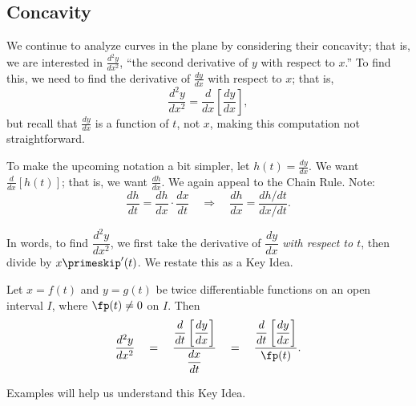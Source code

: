 \subsection{Concavity}

We continue to analyze curves in the plane by considering their concavity; that is, we are interested in $\frac{d^2y}{dx^2}$, ``the second derivative of $y$ with respect to $x$.'' To find this, we need to find the derivative of $\frac{dy}{dx}$ with respect to $x$; that is,
\[\frac{d^2y}{dx^2}=\frac{d}{dx}\left[\frac{dy}{dx}\right],\]
but recall that $\frac{dy}{dx}$ is a function of $t$, not $x$, making this computation not straightforward. 

To make the upcoming notation a bit simpler, let $h(t) = \frac{dy}{dx}$. We want $\frac{d}{dx}[h(t)]$; that is, we want $\frac{dh}{dx}$. We again appeal to the Chain Rule. Note:
\[
\frac{dh}{dt} = \frac{dh}{dx}\cdot\frac{dx}{dt}
\quad \Rightarrow \quad
\frac{dh}{dx} = \frac{dh/dt}{dx/dt}.
\]

In words, to find $\dfrac{d^2y}{dx^2}$, we first take the derivative of $\dfrac{dy}{dx}$ \textit{with respect to $t$}, then divide by $x\primeskip'(t)$. We restate this as a Key Idea.

{Let $x=f(t)$ and $y=g(t)$ be twice differentiable functions on an open interval $I$, where $\fp(t)\neq 0$ on $I$. Then 
\[
\frac{d^2y}{dx^2}
\quad = \quad
\frac{\dfrac{d}{dt}\left[\dfrac{dy}{dx}\right]}{\dfrac{dx}{dt}}
\quad=\quad
\frac{\dfrac{d}{dt}\left[\dfrac{dy}{dx}\right]}{\fp(t)}.
\] 
}

Examples will help us understand this Key Idea.

